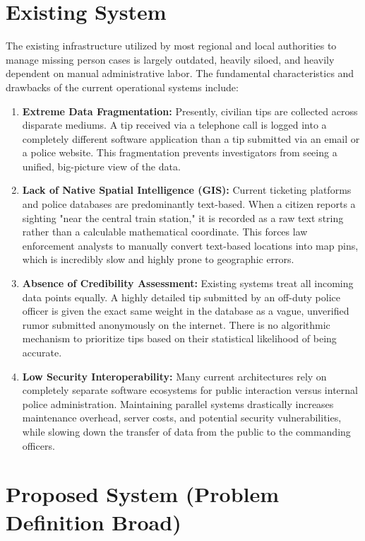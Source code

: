 \documentclass[12pt,a4paper]{report}
\begin{document}
\section{Existing System}
The existing infrastructure utilized by most regional and local authorities to manage missing person cases is largely outdated, heavily siloed, and heavily dependent on manual administrative labor. The fundamental characteristics and drawbacks of the current operational systems include:

\begin{enumerate}
    \item \textbf{Extreme Data Fragmentation:} Presently, civilian tips are collected across disparate mediums. A tip received via a telephone call is logged into a completely different software application than a tip submitted via an email or a police website. This fragmentation prevents investigators from seeing a unified, big-picture view of the data.
    \item \textbf{Lack of Native Spatial Intelligence (GIS):} Current ticketing platforms and police databases are predominantly text-based. When a citizen reports a sighting "near the central train station," it is recorded as a raw text string rather than a calculable mathematical coordinate. This forces law enforcement analysts to manually convert text-based locations into map pins, which is incredibly slow and highly prone to geographic errors.
    \item \textbf{Absence of Credibility Assessment:} Existing systems treat all incoming data points equally. A highly detailed tip submitted by an off-duty police officer is given the exact same weight in the database as a vague, unverified rumor submitted anonymously on the internet. There is no algorithmic mechanism to prioritize tips based on their statistical likelihood of being accurate.
    \item \textbf{Low Security Interoperability:} Many current architectures rely on completely separate software ecosystems for public interaction versus internal police administration. Maintaining parallel systems drastically increases maintenance overhead, server costs, and potential security vulnerabilities, while slowing down the transfer of data from the public to the commanding officers.
\end{enumerate}

\section{Proposed System (Problem Definition Broad)}
\end{document}
